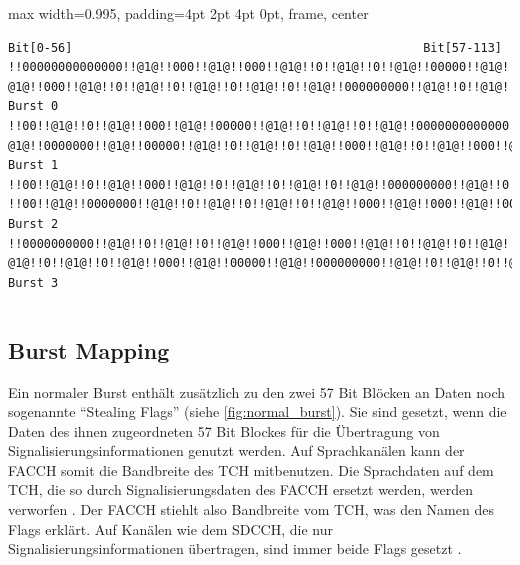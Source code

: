 \begin{samepage}
\begin{adjustbox}{max width={0.995\textwidth}, padding=4pt 2pt 4pt 0pt, frame, center}
\begin{lstlisting}[language=bytetxt, numbers=none]
Bit[0-56]                                                 Bit[57-113]
!!00000000000000!!@1@!!000!!@1@!!000!!@1@!!0!!@1@!!0!!@1@!!00000!!@1@!!00000!!@1@!!0!!@1@!!0!!@1@!!0!!@1@!!000!!@1@!!000!!@1@!!000!!@1@ @1@!!000!!@1@!!0!!@1@!!0!!@1@!!0!!@1@!!0!!@1@!!000000000!!@1@!!0!!@1@!!0!!@1@!!0!!@1@!!000!!@1@!!000!!@1@!!0!!@1@!!00000!!@1@!!000000000000!! Burst 0
!!00!!@1@!!0!!@1@!!000!!@1@!!00000!!@1@!!0!!@1@!!0!!@1@!!0000000000000!!@1@!!0!!@1@!!0!!@1@!!000!!@1@!!000!!@1@!!0!!@1@!!0!!@1@!!000!!@1@!!0!!@1@!!00!! @1@!!0000000!!@1@!!00000!!@1@!!0!!@1@!!0!!@1@!!000!!@1@!!0!!@1@!!000!!@1@!!00000!!@1@!!0!!@1@!!00000!!@1@!!0!!@1@!!0!!@1@!!000!!@1@!!0!!@1@!!0000!! Burst 1
!!00!!@1@!!0!!@1@!!000!!@1@!!0!!@1@!!0!!@1@!!0!!@1@!!000000000!!@1@!!0!!@1@!!0!!@1@!!00000000000!!@1@!!0!!@1@!!000000000!!@1@!!000!!@1@ !!00!!@1@!!0000000!!@1@!!0!!@1@!!0!!@1@!!0!!@1@!!000!!@1@!!000!!@1@!!00000!!@1@!!0!!@1@!!0000000!!@1@!!0!!@1@!!0!!@1@!!000!!@1@!!0!!@1@!!000000!! Burst 2
!!0000000000!!@1@!!0!!@1@!!0!!@1@!!000!!@1@!!000!!@1@!!0!!@1@!!0!!@1@!!0000000000000!!@1@!!0!!@1@!!0!!@1@!!0!!@1@!!0!!@1@!!00000000!! @1@!!0!!@1@!!0!!@1@!!000!!@1@!!00000!!@1@!!000000000!!@1@!!0!!@1@!!0!!@1@!!00000!!@1@!!0000000!!@1@!!0!!@1@!!0!!@1@!!0!!@1@!!0!!@1@!!000!!@1@!!00!! Burst 3
\end{lstlisting}
\end{adjustbox}
\begin{lstlisting}[caption={[Verschachtlung von Testdaten mit block-rectangular Interleaving]Verschachtlung von Testdaten mit block-rectangular Interleaving, Datensatz generiert mit \texttt{dummycoder} (siehe \autoref{hdl:coder-impl})}, basicstyle=\tiny]
\end{lstlisting}
\end{samepage}

\subsection{Burst Mapping}\label{hdl:burst-mapping}
Ein normaler Burst enthält zusätzlich zu den zwei 57 Bit Blöcken an Daten noch sogenannte "`Stealing Flags"' (siehe \autoref{fig:normal_burst}). Sie sind gesetzt, wenn die Daten des ihnen zugeordneten 57 Bit Blockes für die Übertragung von Signalisierungsinformationen genutzt werden. Auf Sprachkanälen kann der \ac{FACCH} somit die Bandbreite des \ac{TCH} mitbenutzen. Die Sprachdaten auf dem \ac{TCH}, die so durch Signalisierungsdaten des \ac{FACCH} ersetzt werden, werden verworfen . Der \ac{FACCH} stiehlt also Bandbreite vom \ac{TCH}, was den Namen des Flags erklärt. Auf Kanälen wie dem \ac{SDCCH}, die nur Signalisierungsinformationen übertragen, sind immer beide Flags gesetzt .

